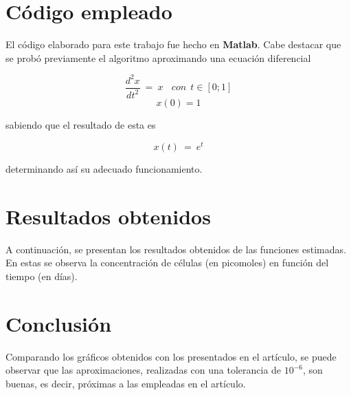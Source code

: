 \documentclass[a4paper]{article}
\begin{document}
\section{Código empleado}
El código elaborado para este trabajo fue hecho en \textbf{Matlab}.
Cabe destacar que se probó previamente el algoritmo aproximando una ecuación diferencial

\[ \frac{{d}^{2}x}{{dt}^{2}} \ = \ x \ \ \ \ con \ \ t \in [0;1]\]
\[ x(0) = 1 \]

sabiendo que el resultado de esta es

\[ x(t) \ = \ e^t \]

determinando así su adecuado funcionamiento.
	
	
	
\section{Resultados obtenidos}
A continuación, se presentan los resultados obtenidos de las funciones estimadas. En estas se observa la concentración de células (en picomoles) en función del tiempo (en días). 



\section{Conclusión}
Comparando los gráficos obtenidos con los presentados en el artículo, se puede observar que las aproximaciones, realizadas con una tolerancia de $10^{-6}$, son buenas, es decir, próximas a las empleadas en el artículo. 	
 
\end{document}
